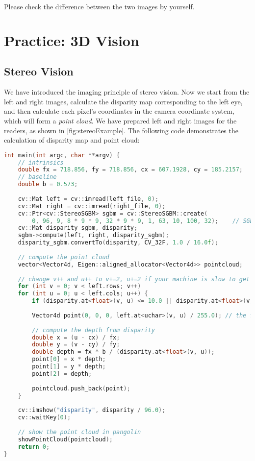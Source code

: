 Please check the difference between the two images by yourself.

\section{Practice: 3D Vision}
\subsection{Stereo Vision}
We have introduced the imaging principle of stereo vision. Now we start from the left and right images, calculate the disparity map corresponding to the left eye, and then calculate each pixel's coordinates in the camera coordinate system, which will form a \textit{point cloud}. We have prepared left and right images for the readers, as shown in \autoref {fig:stereoExample}. The following code demonstrates the calculation of disparity map and point cloud:

\begin{lstlisting}[language=C++,caption=slambook/ch5/stereoVision/stereoVision.cpp (Part)]
int main(int argc, char **argv) {
    // intrinsics
    double fx = 718.856, fy = 718.856, cx = 607.1928, cy = 185.2157;
    // baseline
    double b = 0.573;
    
    cv::Mat left = cv::imread(left_file, 0);
    cv::Mat right = cv::imread(right_file, 0);
    cv::Ptr<cv::StereoSGBM> sgbm = cv::StereoSGBM::create(
        0, 96, 9, 8 * 9 * 9, 32 * 9 * 9, 1, 63, 10, 100, 32);    // SGBM is senstive to parameters
    cv::Mat disparity_sgbm, disparity;
    sgbm->compute(left, right, disparity_sgbm);
    disparity_sgbm.convertTo(disparity, CV_32F, 1.0 / 16.0f);
    
    // compute the point cloud
    vector<Vector4d, Eigen::aligned_allocator<Vector4d>> pointcloud;
    
    // change v++ and u++ to v+=2, u+=2 if your machine is slow to get a sparser cloud
    for (int v = 0; v < left.rows; v++)
    for (int u = 0; u < left.cols; u++) {
        if (disparity.at<float>(v, u) <= 10.0 || disparity.at<float>(v, u) >= 96.0) continue;
        
        Vector4d point(0, 0, 0, left.at<uchar>(v, u) / 255.0); // the first three dimensions are xyz, the 4-th is the color
        
        // compute the depth from disparity
        double x = (u - cx) / fx;
        double y = (v - cy) / fy;
        double depth = fx * b / (disparity.at<float>(v, u));
        point[0] = x * depth;
        point[1] = y * depth;
        point[2] = depth;
        
        pointcloud.push_back(point);
    }
    
    cv::imshow("disparity", disparity / 96.0);
    cv::waitKey(0);
    
    // show the point cloud in pangolin
    showPointCloud(pointcloud);
    return 0;
}
\end{lstlisting}

